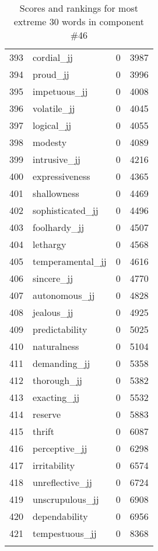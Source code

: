 \begin{longtable}[!htbp]{| rlr@{.}l |}
    393 & cordial\_jj & 0 & 3987 \\
    394 & proud\_jj & 0 & 3996 \\
    395 & impetuous\_jj & 0 & 4008 \\
    396 & volatile\_jj & 0 & 4045 \\
    397 & logical\_jj & 0 & 4055 \\
    398 & modesty & 0 & 4089 \\
    399 & intrusive\_jj & 0 & 4216 \\
    400 & expressiveness & 0 & 4365 \\
    401 & shallowness & 0 & 4469 \\
    402 & sophisticated\_jj & 0 & 4496 \\
    403 & foolhardy\_jj & 0 & 4507 \\
    404 & lethargy & 0 & 4568 \\
    405 & temperamental\_jj & 0 & 4616 \\
    406 & sincere\_jj & 0 & 4770 \\
    407 & autonomous\_jj & 0 & 4828 \\
    408 & jealous\_jj & 0 & 4925 \\
    409 & predictability & 0 & 5025 \\
    410 & naturalness & 0 & 5104 \\
    411 & demanding\_jj & 0 & 5358 \\
    412 & thorough\_jj & 0 & 5382 \\
    413 & exacting\_jj & 0 & 5532 \\
    414 & reserve & 0 & 5883 \\
    415 & thrift & 0 & 6087 \\
    416 & perceptive\_jj & 0 & 6298 \\
    417 & irritability & 0 & 6574 \\
    418 & unreflective\_jj & 0 & 6724 \\
    419 & unscrupulous\_jj & 0 & 6908 \\
    420 & dependability & 0 & 6956 \\
    421 & tempestuous\_jj & 0 & 8368 \\
    \hline
    \caption{Scores and rankings for most extreme 30 words in component \#46} \\
\end{longtable}
